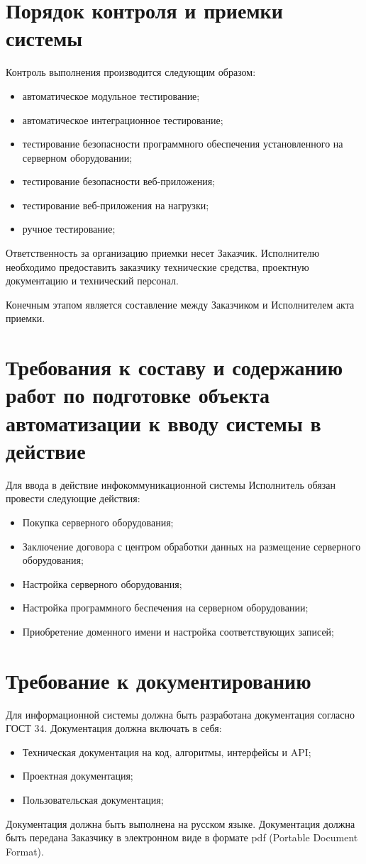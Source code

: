 \documentclass[14pt]{extreport}
\begin{document}
\chapter{Порядок контроля и приемки системы} 
    Контроль выполнения производится следующим образом:
    \begin{itemize}
        \item автоматическое модульное тестирование;
        \item автоматическое интеграционное тестирование;
        \item тестирование безопасности программного обеспечения установленного на серверном оборудовании;
        \item тестирование безопасности веб-приложения;
        \item тестирование веб-приложения на нагрузки;
        \item ручное тестирование;
        \end{itemize}

    Ответственность за организацию приемки несет Заказчик. Исполнителю необходимо предоставить заказчику технические средства, проектную документацию и технический персонал.

    Конечным этапом является составление между Заказчиком и Исполнителем акта приемки. 

\chapter{Требования к составу и содержанию работ по подготовке объекта автоматизации к вводу системы в действие}
    Для ввода в действие инфокоммуникационной системы Исполнитель обязан провести следующие действия:
    \begin{itemize}
        \item Покупка серверного оборудования;
        \item Заключение договора с центром обработки данных на размещение серверного оборудования;
        \item Настройка серверного оборудования;
        \item Настройка программного беспечения на серверном оборудовании;
        \item Приобретение доменного имени и настройка соответствующих записей;
    \end{itemize}

\chapter{Требование к документированию}
    Для информационной системы должна быть разработана документация согласно ГОСТ 34. Документация должна включать в себя: 
    \begin{itemize}
        \item Техническая документация на код, алгоритмы, интерфейсы и API;
        \item Проектная документация;
        \item Пользовательская документация;
    \end{itemize}
    Документация должна быть выполнена на русском языке. Документация должна быть передана Заказчику в электронном виде в формате pdf (Portable Document Format).
\end{document}
